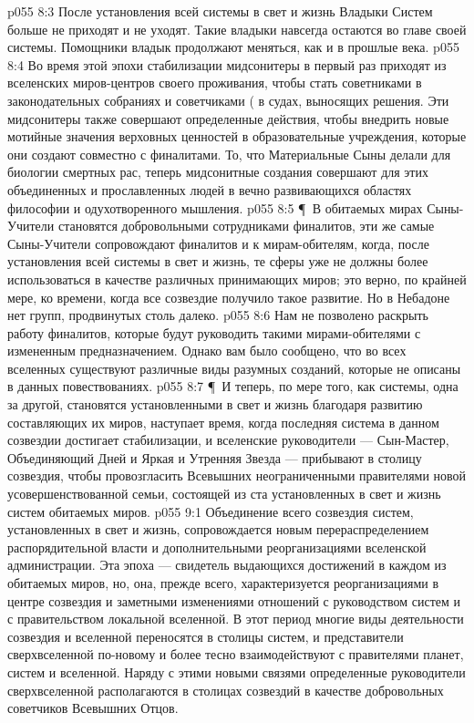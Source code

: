 \vs p055 8:3 После установления всей системы в свет и жизнь Владыки Систем больше не приходят и не уходят. Такие владыки навсегда остаются во главе своей системы. Помощники владык продолжают меняться, как и в прошлые века.
\vs p055 8:4 Во время этой эпохи стабилизации мидсонитеры в первый раз приходят из вселенских миров\hyp{}центров своего проживания, чтобы стать советниками в законодательных собраниях и советчиками ( в судах, выносящих решения. Эти мидсонитеры также совершают определенные действия, чтобы внедрить новые мотийные значения верховных ценностей в образовательные учреждения, которые они создают совместно с финалитами. То, что Материальные Сыны делали для биологии смертных рас, теперь мидсонитные создания совершают для этих объединенных и прославленных людей в вечно развивающихся областях философии и одухотворенного мышления.
\vs p055 8:5 \P\ В обитаемых мирах Сыны\hyp{}Учители становятся добровольными сотрудниками финалитов, эти же самые Сыны\hyp{}Учители сопровождают финалитов и к мирам\hyp{}обителям, когда, после установления всей системы в свет и жизнь, те сферы уже не должны более использоваться в качестве различных принимающих миров; это верно, по крайней мере, ко времени, когда все созвездие получило такое развитие. Но в Небадоне нет групп, продвинутых столь далеко.
\vs p055 8:6 Нам не позволено раскрыть работу финалитов, которые будут руководить такими мирами\hyp{}обителями с измененным предназначением. Однако вам было сообщено, что во всех вселенных существуют различные виды разумных созданий, которые не описаны в данных повествованиях.
\vs p055 8:7 \P\ И теперь, по мере того, как системы, одна за другой, становятся установленными в свет и жизнь благодаря развитию составляющих их миров, наступает время, когда последняя система в данном созвездии достигает стабилизации, и вселенские руководители --- Сын\hyp{}Мастер, Объединяющий Дней и Яркая и Утренняя Звезда --- прибывают в столицу созвездия, чтобы провозгласить Всевышних неограниченными правителями новой усовершенствованной семьи, состоящей из ста установленных в свет и жизнь систем обитаемых миров.
\vs p055 9:1 Объединение всего созвездия систем, установленных в свет и жизнь, сопровождается новым перераспределением распорядительной власти и дополнительными реорганизациями вселенской администрации. Эта эпоха --- свидетель выдающихся достижений в каждом из обитаемых миров, но, она, прежде всего, характеризуется реорганизациями в центре созвездия и заметными изменениями отношений с руководством систем и с правительством локальной вселенной. В этот период многие виды деятельности созвездия и вселенной переносятся в столицы систем, и представители сверхвселенной по\hyp{}новому и более тесно взаимодействуют с правителями планет, систем и вселенной. Наряду с этими новыми связями определенные руководители сверхвселенной располагаются в столицах созвездий в качестве добровольных советчиков Всевышних Отцов.
